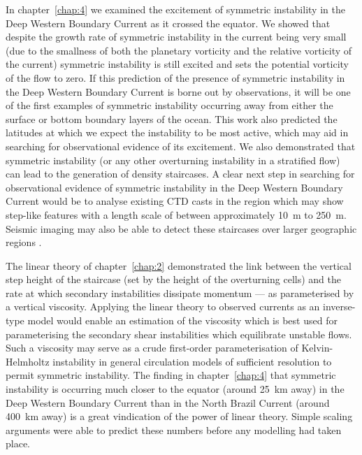 In chapter~\ref{chap:4} we examined the excitement of symmetric instability in the Deep Western Boundary Current as it crossed the equator. We showed that despite the growth rate of symmetric instability in the current being very small (due to the smallness of both the planetary vorticity and the relative vorticity of the current) symmetric instability is still excited and sets the potential vorticity of the flow to zero. If this prediction of the presence of symmetric instability in the Deep Western Boundary Current is borne out by observations, it will be one of the first examples of symmetric instability occurring away from either the surface or bottom boundary layers of the ocean. This work also predicted the latitudes at which we expect the instability to be most active, which may aid in searching for observational evidence of its excitement. We also demonstrated that symmetric instability (or any other overturning instability in a stratified flow) can lead to the generation of density staircases. A clear next step in searching for observational evidence of symmetric instability in the Deep Western Boundary Current would be to analyse existing CTD casts in the region which may show step-like features with a length scale of between approximately 10~m to 250~m. Seismic imaging may also be able to detect these staircases over larger geographic regions \citep[e.g][]{Fer2010}.

The linear theory of chapter~\ref{chap:2} demonstrated the link between the vertical step height of the staircase (set by the height of the overturning cells) and the rate at which secondary instabilities dissipate momentum --- as parameterised by a vertical viscosity. Applying the linear theory to observed currents as an inverse-type model would enable an estimation of the viscosity which is best used for parameterising the secondary shear instabilities which equilibrate unstable flows. Such a viscosity may serve as a crude first-order parameterisation of Kelvin-Helmholtz instability in general circulation models of sufficient resolution to permit symmetric instability. The finding in chapter~\ref{chap:4} that symmetric instability is occurring much closer to the equator (around 25~km away) in the Deep Western Boundary Current than in the North Brazil Current (around 400~km away) is a great vindication of the power of linear theory. Simple scaling arguments were able to predict these numbers before any modelling had taken place.

